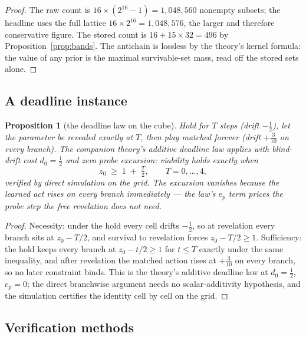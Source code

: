 \documentclass[10pt,twocolumn]{article}
\theoremstyle{plain}
\newtheorem{proposition}[theorem]{Proposition}
\theoremstyle{definition}
\theoremstyle{remark}
\begin{document}
\begin{proof}
The raw count is \(16 \times (2^{16} - 1) = 1{,}048{,}560\) nonempty
subsets; the headline uses the full lattice
\(16 \times 2^{16} = 1{,}048{,}576\), the larger and therefore
conservative figure. The stored count is
\(16 + 15 \times 32 = 496\) by Proposition~\ref{prop:bands}. The
antichain is lossless by the theory's kernel formula: the
value of any prior is the maximal survivable-set mass, read off the
stored sets alone.
\end{proof}

\subsection{A deadline instance}\label{deadline}

\begin{proposition}[the deadline law on the cube]\label{prop:deadline}
Hold for \(T\) steps (drift \(-\tfrac12\)), let the parameter be
revealed exactly at \(T\), then play matched forever (drift
\(+\tfrac3{10}\) on every branch). The companion theory's additive
deadline law applies with blind-drift cost \(d_{0} = \tfrac12\) and
zero probe excursion: viability holds exactly when
\[
z_{0} \;\ge\; 1 \;+\; \tfrac{T}{2}, \qquad T = 0, \dots, 4,
\]
verified by direct simulation on the grid. The excursion vanishes
because the learned act rises on every branch immediately --- the
law's \(e_{p}\) term prices the probe step the free revelation does
not need.
\end{proposition}

\begin{proof}
Necessity: under the hold every cell drifts \(-\tfrac12\), so at
revelation every branch sits at \(z_{0} - T/2\), and survival to
revelation forces \(z_{0} - T/2 \ge 1\). Sufficiency: the hold keeps
every branch at \(z_{0} - t/2 \ge 1\) for \(t \le T\) exactly
under the same inequality, and after revelation the matched action
rises at \(+\tfrac3{10}\) on every branch, so no later constraint
binds. This is the theory's additive deadline law at
\(d_{0} = \tfrac12\), \(e_{p} = 0\); the direct branchwise argument
needs no scalar-additivity hypothesis, and the simulation certifies
the identity cell by cell on the grid.
\end{proof}

\subsection{Verification methods}\label{methods}
\end{document}
